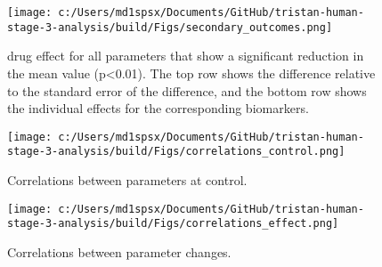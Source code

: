 \documentclass{epflreport}%
\begin{document}
%
\clearpage%


\begin{figure}[h!]%
\centering%
\texttt{[image: c:/Users/md1spsx/Documents/GitHub/tristan-human-stage-3-analysis/build/Figs/secondary\_outcomes.png]}%
\caption{drug effect for all parameters that show a significant reduction in the mean value (p<0.01). The top row shows the difference relative to the standard error of the difference, and the bottom row shows the individual effects for the corresponding biomarkers.}%
\end{figure}

%
\clearpage%


\begin{figure}[h!]%
\centering%
\texttt{[image: c:/Users/md1spsx/Documents/GitHub/tristan-human-stage-3-analysis/build/Figs/correlations\_control.png]}%
\caption{Correlations between parameters at control.}%
\end{figure}

%
\clearpage%


\begin{figure}[h!]%
\centering%
\texttt{[image: c:/Users/md1spsx/Documents/GitHub/tristan-human-stage-3-analysis/build/Figs/correlations\_effect.png]}%
\caption{Correlations between parameter changes.}%
\end{figure}

%
\clearpage%
\end{document}
